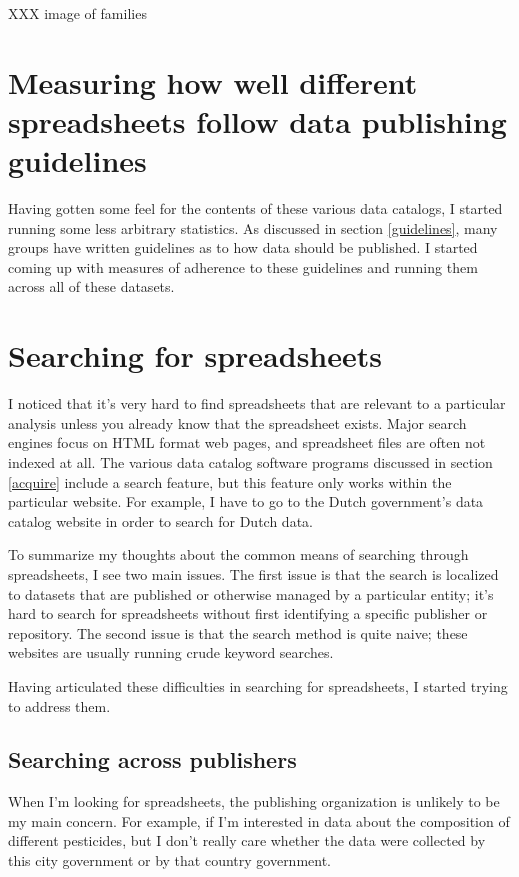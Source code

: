 \documentclass{acm_proc_article-sp}
\begin{document}
XXX image of families




\section{Measuring how well different spreadsheets follow data publishing guidelines}
Having gotten some feel for the contents of these various data catalogs,
I started running some less arbitrary statistics.
As discussed in section \ref{guidelines}, many groups have written guidelines
as to how data should be published.
\cite{open-data-census,fivestars,sunlight,sebastopol,odi}
I started coming up with measures of adherence to these guidelines and running
them across all of these datasets.










\section{Searching for spreadsheets}
I noticed that it's very hard to find spreadsheets that are relevant
to a particular analysis unless you already know that the spreadsheet exists.
Major search engines focus on HTML format web pages, and spreadsheet files
are often not indexed at all. The various data catalog software programs
discussed in section \ref{acquire} include a search feature, but this feature
only works within the particular website. For example, I have to go to the
Dutch government's data catalog website in order to search for Dutch data.

To summarize my thoughts about the common means of searching through
spreadsheets, I see two main issues.
The first issue is that the search is localized to datasets that are published
or otherwise managed by a particular entity; it's hard to search for
spreadsheets without first identifying a specific publisher or repository.
The second issue is that the search method is quite naive; these websites are
usually running crude keyword searches.

Having articulated these difficulties in searching for spreadsheets, I started
trying to address them.

\subsection{Searching across publishers}
When I'm looking for spreadsheets, the publishing organization is unlikely
to be my main concern. For example, if I'm interested in data about the
composition of different pesticides, but I don't really care whether the
data were collected by this city government or by that country government.
\end{document}

